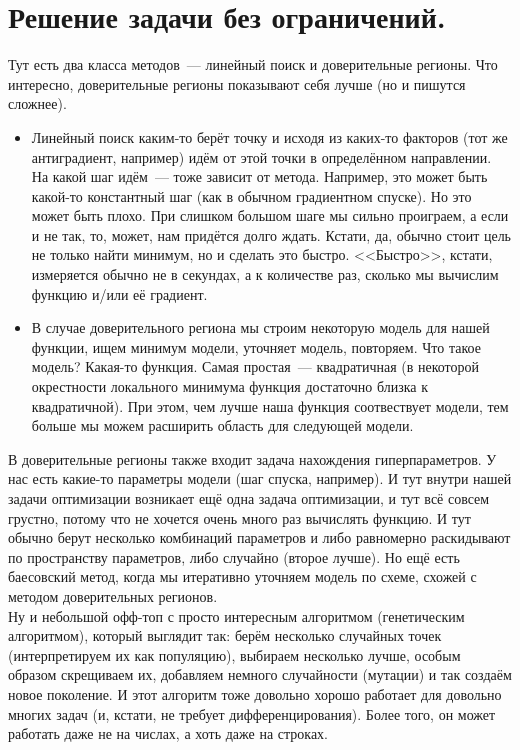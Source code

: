 \documentclass{article}
\begin{document}
    \section{Решение задачи без ограничений.}
    Тут есть два класса методов~--- линейный поиск и доверительные регионы. Что интересно, доверительные регионы показывают себя лучше (но и пишутся сложнее).
    \begin{itemize}
        \item Линейный поиск каким-то берёт точку и исходя из каких-то факторов (тот же антиградиент, например) идём от этой точки в определённом направлении. На какой шаг идём~--- тоже зависит от метода. Например, это может быть какой-то константный шаг (как в обычном градиентном спуске). Но это может быть плохо. При слишком большом шаге мы сильно проиграем, а если и не так, то, может, нам придётся долго ждать. Кстати, да, обычно стоит цель не только найти минимум, но и сделать это быстро. <<Быстро>>, кстати, измеряется обычно не в секундах, а к количестве раз, сколько мы вычислим функцию и/или её градиент.
        \item В случае доверительного региона мы строим некоторую модель для нашей функции, ищем минимум модели, уточняет модель, повторяем. Что такое модель? Какая-то функция. Самая простая~--- квадратичная (в некоторой окрестности локального минимума функция достаточно близка к квадратичной). При этом, чем лучше наша функция соотвествует модели, тем больше мы можем расширить область для следующей модели.
    \end{itemize}
    В доверительные регионы также входит задача нахождения гиперпараметров. У нас есть какие-то параметры модели (шаг спуска, например). И тут внутри нашей задачи оптимизации возникает ещё одна задача оптимизации, и тут всё совсем грустно, потому что не хочется очень много раз вычислять функцию. И тут обычно берут несколько комбинаций параметров и либо равномерно раскидывают по пространству параметров, либо случайно (второе лучше). Но ещё есть баесовский метод, когда мы итеративно уточняем модель по схеме, схожей с методом доверительных регионов.\\
    Ну и небольшой офф-топ с просто интересным алгоритмом (генетическим алгоритмом), который выглядит так: берём несколько случайных точек (интерпретируем их как популяцию), выбираем несколько лучше, особым образом скрещиваем их, добавляем немного случайности (мутации) и так создаём новое поколение. И этот алгоритм тоже довольно хорошо работает для довольно многих задач (и, кстати, не требует дифференцирования). Более того, он может работать даже не на числах, а хоть даже на строках.
\end{document}
